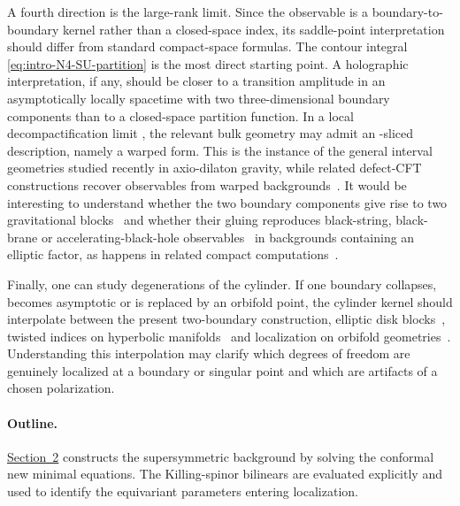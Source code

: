\documentclass[11pt,a4paper]{article}
\makeatletter
\numberwithin{equation}{section}
\theoremstyle{plain}
\theoremstyle{definition}
\theoremstyle{remark}
\newcounter{mathrecordid}
\newcommand{\mathboxbegin}[1]{%
  \stepcounter{mathrecordid}%
  \immediate\write\mathrecords{\themathrecordid,#1}%
  \special{pdf:bann << /Type /Annot /Subtype /Link /Border [0 0 0]
    /MathBoxID \themathrecordid /F 2
    /A << /S /URI /URI (urn:mathbox:\themathrecordid) >> >>}}
\newcommand{\mathboxinlineplain}[1]{$#1$}
\newcommand{\mathboxinline}[1]{%
  $\mathboxbegin{inline}%
  \special{pdf:literal direct /MathBoxBegin\themathrecordid\space MP}%
  #1\special{pdf:literal direct /MathBoxEnd\themathrecordid\space MP}%
  \special{pdf:eann}$}
\newcommand{\recordmath}{%
  \ifmeasuring@\expandafter\mathboxinlineplain
  \else\expandafter\mathboxinline\fi}
\makeatother
\begin{document}
A fourth direction is the large-rank limit.  Since the observable is a boundary-to-boundary kernel rather than a closed-space index, its saddle-point interpretation should differ from standard compact-space formulas.  The  \recordmath{SU(N)} \recordmath{\mathcal N=4} contour integral \eqref{eq:intro-N4-SU-partition} is the most direct starting point. A holographic interpretation, if any, should be closer to a transition amplitude in an asymptotically locally \recordmath{AdS_5} spacetime with two three-dimensional boundary components than to a closed-space partition function.  In a local decompactification limit \recordmath{T^3\simeq\mathbb R^3}, the relevant bulk geometry may admit an \recordmath{AdS_4}-sliced description, namely a warped \recordmath{AdS_4\times I} form.  This is the \recordmath{D=4} instance of the general \recordmath{AdS_D\times I} interval geometries studied recently in axio-dilaton gravity, while related defect-CFT constructions recover observables from warped \recordmath{AdS_p\times S^q\times I} backgrounds~\cite{Faedo:2026defect,Dibitetto:2026axiodilaton,Dibitetto:2026adsnine}.  It would be interesting to understand whether the two boundary components give rise to two gravitational blocks~\cite{Hosseini:2019iad} and whether their gluing reproduces black-string, black-brane or accelerating-black-hole observables~\cite{Benini:2013cda} in backgrounds containing an elliptic factor, as happens in related compact computations~\cite{Hosseini:2016tor,Hosseini:2019lkt,Hong:2018viz,Inglese:2023wky,Colombo:2024mts}.

Finally, one can study degenerations of the cylinder.  If one boundary collapses, becomes asymptotic or is replaced by an orbifold point, the cylinder kernel should interpolate between the present two-boundary construction, elliptic disk blocks~\cite{Longhi:2019hdh}, twisted indices on hyperbolic manifolds~\cite{Pittelli:2018rpl,Iannotti:2023jji} and localization on orbifold geometries~\cite{Inglese:2023wky,Inglese:2023tyc,Pittelli:2024ugf}.  Understanding this interpolation may clarify which degrees of freedom are genuinely localized at a boundary or singular point and which are artifacts of a chosen polarization.

\paragraph{Outline.}

\hyperref[sec:geometry-loc]{Section~2} constructs the supersymmetric background by solving the conformal new minimal equations. The Killing-spinor bilinears are evaluated explicitly and used to identify the equivariant parameters entering localization.
\end{document}
